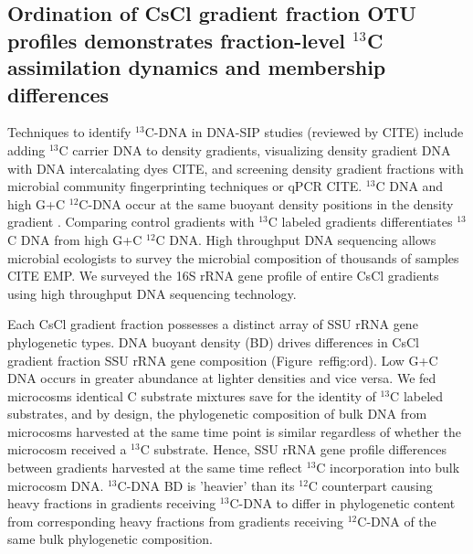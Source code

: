 \subsection{Ordination of CsCl gradient fraction OTU profiles demonstrates
fraction-level $^{13}$C assimilation dynamics and membership differences}
Techniques to identify $^{13}$C-DNA in DNA-SIP studies (reviewed by CITE)
include adding $^{13}$C carrier DNA to density gradients, visualizing
density gradient DNA with DNA intercalating dyes CITE, and screening
density gradient fractions with microbial community fingerprinting
techniques or qPCR CITE. $^{13}$C DNA and high G+C $^{12}$C-DNA occur at
the same buoyant density positions in the density gradient
\citep{Buckley_2007}. Comparing control gradients with $^{13}$C labeled
gradients differentiates $^{13}$C DNA from high G+C $^{12}$C DNA. High
throughput DNA sequencing allows microbial ecologists to survey the
microbial composition of thousands of samples CITE EMP. We surveyed the
16S rRNA gene profile of entire CsCl gradients using high throughput DNA
sequencing technology.

Each CsCl gradient fraction possesses a distinct array of SSU rRNA gene
phylogenetic types. DNA buoyant density (BD) drives differences in CsCl
gradient fraction SSU rRNA gene composition (Figure~ref{fig:ord}). Low G+C
DNA occurs in greater abundance at lighter densities and vice versa. We
fed microcosms identical C substrate mixtures save for the identity of
$^{13}$C labeled substrates, and by design, the phylogenetic composition
of bulk DNA from microcosms harvested at the same time point is similar
regardless of whether the microcosm received a $^{13}$C substrate. Hence,
SSU rRNA gene profile differences between gradients harvested at the same
time reflect $^{13}$C incorporation into bulk microcosm DNA. $^{13}$C-DNA
BD is 'heavier' than its $^{12}$C counterpart causing heavy fractions in
gradients receiving $^{13}$C-DNA to differ in phylogenetic content from
corresponding heavy fractions from gradients receiving $^{12}$C-DNA of the
same bulk phylogenetic composition.


